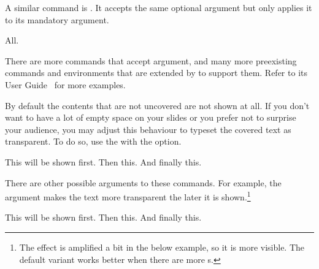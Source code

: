 A similar command is . It accepts the same optional  argument but only applies it to its mandatory argument.
\begin{chktexignore}
\begin{example}[
  vertical_mode,
  to_page=3,
  paperheight=2.8cm,
  paperwidth=3.7cm,
  examplewidth=.95\linewidth,
]
\begin{frame}
     All.
\end{frame}
\end{example}
\end{chktexignore}
There are more commands that accept  argument, and
many more preexisting commands and environments that are extended by
 to support them. Refer to its User Guide~\cite{pack:beamer} for
more examples.

By default the contents that are not uncovered are not shown at all. If you
don't want to have a lot of empty space on your slides or you prefer not to
surprise your audience, you may adjust this behaviour to typeset the covered
text as transparent. To do so, use the  with the
 option.
\begin{example}[
  vertical_mode,
  to_page=3,
  paperheight=2.8cm,
  paperwidth=3.7cm,
  examplewidth=.95\linewidth,
]

\begin{frame}
  This will be shown first. \pause Then this. \pause
  And finally this.
\end{frame}
\end{example}
There are other possible arguments to these commands. For example, the
 argument makes the text more transparent the later it is
shown.\footnote{The effect is amplified a bit in the below example, so it is
  more visible. The default variant works better when there are more
  s.}
\begin{example}[
  vertical_mode,
  to_page=3,
  paperheight=2.8cm,
  paperwidth=3.7cm,
  examplewidth=.95\linewidth,
]

\begin{frame}
  This will be shown first. \pause Then this. \pause
  And finally this.
\end{frame}
\end{example}

